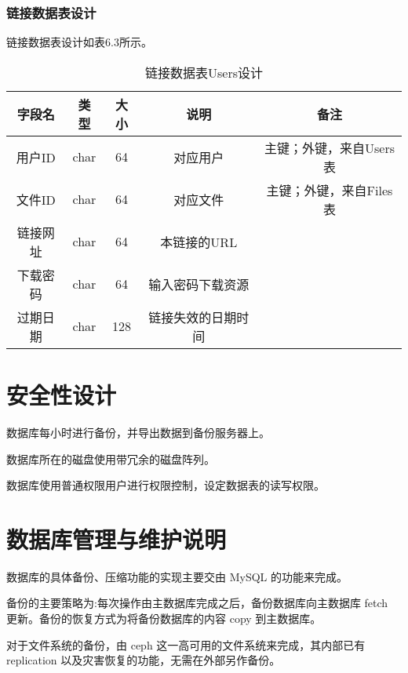 \subsubsection{链接数据表设计}
链接数据表设计如表6.3所示。
\begin{table}[htbp]
\centering
\caption{链接数据表Users设计} \label{tab:link-database}
\begin{tabular}{|c|c|c|c|c|}
    \hline
    字段名 & 类型 & 大小 & 说明 & 备注 \\
    \hline
    用户ID & char & 64 & 对应用户 & 主键；外键，来自Users表\\
    \hline
    文件ID & char & 64 & 对应文件 & 主键；外键，来自Files表\\
    \hline
    链接网址 & char & 64 & 本链接的URL & \\
    \hline
    下载密码 & char & 64 & 输入密码下载资源 & \\
    \hline
    过期日期 & char & 128 & 链接失效的日期时间 & \\
    \hline
\end{tabular}
\end{table}

\section{安全性设计}
数据库每小时进行备份，并导出数据到备份服务器上。

数据库所在的磁盘使用带冗余的磁盘阵列。

数据库使用普通权限用户进行权限控制，设定数据表的读写权限。

\section{数据库管理与维护说明}
数据库的具体备份、压缩功能的实现主要交由 MySQL 的功能来完成。

备份的主要策略为:每次操作由主数据库完成之后，备份数据库向主数据库 fetch 更新。备份的恢复方式为将备份数据库的内容 copy 到主数据库。

对于文件系统的备份，由 ceph 这一高可用的文件系统来完成，其内部已有 replication 以及灾害恢复的功能，无需在外部另作备份。